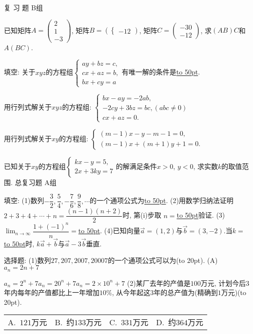 \documentclass[10pt,a4paper]{article}
\newcommand{\blank}[1]{\underline{\hbox to #1pt{}}}
\newcommand{\bracket}[1]{(\hbox to #1pt{})}
\newcommand{\fourch}[4]{\par\begin{tabular}{p{.23\textwidth}p{.23\textwidth}p{.23\textwidth}p{.23\textwidth}}
A.~#1 &B.~#2& C.~#3& D.~#4
\end{tabular}}
\begin{document}
\begin{enumerate}[1.]
{复 习 题
B组
\item 已知矩阵$A=\begin{pmatrix}
    2  \\1  \\-3  \end{pmatrix}$, 矩阵$B=(\begin{cases}
    -1  2  \end{cases})$, 矩阵$C=\begin{pmatrix}
    -3  0  \\-1  2  \end{pmatrix}$, 求$(AB)C$和$A(BC)$.
\item 填空:
关于$xyz$的方程组$\begin{cases}
    ay+bz=c,  \\cx+az=b,  \\bx+cy=a  \end{cases}$有唯一解的条件是\blank{50}.
\item 用行列式解关于$xyz$的方程组:
$\begin{cases}
    bx-ay=-2ab,  \\-2cy+3bz=bc,(abc\ne 0)  \\cx+az=0.  \end{cases}$
\item 用行列式解关于$xy$的方程组:
$\begin{cases}
 (m-1)x-y-m-1=0,  \\(m-1)x+(m+1)y+1=0.  \end{cases}$
\item 已知关于$xy$的方程组$\begin{cases}
    kx-y=5,  \\2x+3ky=7  \end{cases}$的解满足条件$x>0$, $y<0$, 求实数$k$的取值范围.
总复习题
A组
\item 填空:
(1)数列$-\dfrac 32,\dfrac 54,-\dfrac 76,\dfrac 98,\cdots$的一个通项公式为\blank{50}.
(2)用数学归纳法证明$2+3+4+\cdots +n=\dfrac{(n-1)(n+2)}2$时, 第(i)步取
$n=$\blank{50}验证.
(3)$\displaystyle\lim_{n\to\infty}\dfrac{1+(-1)^n}n=$\blank{50}.
(4)已知向量$\overrightarrow a=(1,2)$与$\overrightarrow b=(3,-2)$.当$k=$\blank{50}时, $k\overrightarrow a+\overrightarrow b$与$\overrightarrow a-3\overrightarrow b$垂直.
\item 选择题:
(1)数列$27, 207, 2 007, 20 007$的一个通项公式可以为\bracket{20}.
(A)$a_n=2n+7$}{$a_n=2^n+7$}{$a_n=20^n+7$}{$a_n=2\times 10^n+7$}
(2)某厂去年的产值是$100$万元, 计划今后$3$年内每年的产值都比上一年增加$10\%$, 从今年起这$3$年的总产值为(精确到$1$万元)\bracket{20}.
\fourch{$121$万元}{约$133$万元}{$331$万元}{约$364$万元}

\end{enumerate}
\end{document}
